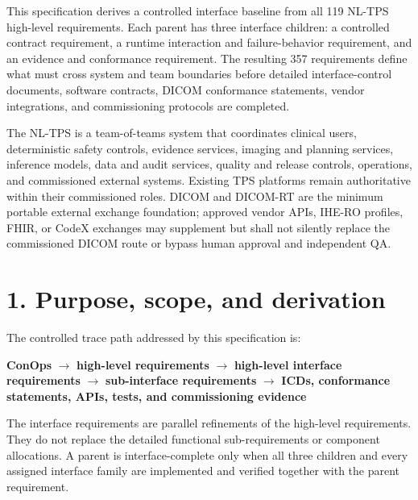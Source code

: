 \documentclass[11pt,letterpaper]{article}
\begin{document}

This specification derives a controlled interface baseline from all 119 NL-TPS high-level requirements. Each parent has three interface children: a controlled contract requirement, a runtime interaction and failure-behavior requirement, and an evidence and conformance requirement. The resulting 357 requirements define what must cross system and team boundaries before detailed interface-control documents, software contracts, DICOM conformance statements, vendor integrations, and commissioning protocols are completed.

The NL-TPS is a team-of-teams system that coordinates clinical users, deterministic safety controls, evidence services, imaging and planning services, inference models, data and audit services, quality and release controls, operations, and commissioned external systems. Existing TPS platforms remain authoritative within their commissioned roles. DICOM and DICOM-RT are the minimum portable external exchange foundation; approved vendor APIs, IHE-RO profiles, FHIR, or CodeX exchanges may supplement but shall not silently replace the commissioned DICOM route or bypass human approval and independent QA.

\section{1. Purpose, scope, and derivation}
The controlled trace path addressed by this specification is:
\begin{center}
\textbf{ConOps} $\rightarrow$ \textbf{high-level requirements} $\rightarrow$ \textbf{high-level interface requirements} $\rightarrow$ \textbf{sub-interface requirements} $\rightarrow$ \textbf{ICDs, conformance statements, APIs, tests, and commissioning evidence}
\end{center}
The interface requirements are parallel refinements of the high-level requirements. They do not replace the detailed functional sub-requirements or component allocations. A parent is interface-complete only when all three children and every assigned interface family are implemented and verified together with the parent requirement.
\end{document}
